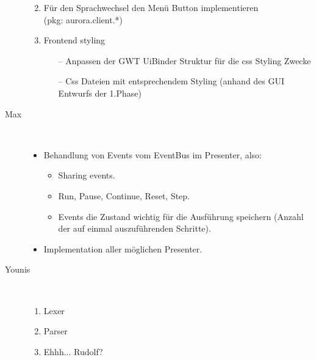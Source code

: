 \documentclass[parskip=full,11pt,twoside]{scrartcl}
\begin{document}
\begin{description}
\begin{enumerate}
\begin{itemize}
    \end{itemize}

    \item Für den Sprachwechsel den Menü Button implementieren \\(pkg: aurora.client.*)

    \item Frontend styling

    \begin{itemize}

	\item[--] Anpassen der GWT UiBinder Struktur für die css Styling Zwecke

	\item[--] Css Dateien mit entsprechendem Styling (anhand des GUI Entwurfs der 1.Phase)

    \end{itemize}

    \end{enumerate}

    \item [Max]\hfill \\
    	\begin{itemize}
        	\item Behandlung von Events vom EventBus im Presenter, also:
            \begin{itemize}
            	\item Sharing events.
                \item Run, Pause, Continue, Reset, Step.
                \item Events die Zustand wichtig für die Ausführung speichern (Anzahl der auf einmal auszuführenden Schritte).
            \end{itemize}
            \item Implementation aller möglichen Presenter.
        \end{itemize}
    \item [Younis]\hfill \\
	\begin{enumerate}
		\item Lexer
		\item Parser
		\item Ehhh... Rudolf?
	\end{enumerate}
    

\end{description}
\end{document}
